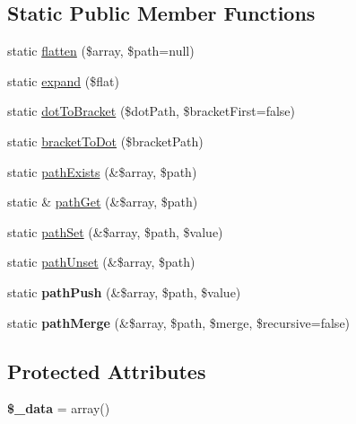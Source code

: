 \subsection*{Static Public Member Functions}
\begin{DoxyCompactItemize}
\item 
static \hyperlink{classMatrix_adcb5796c89a9d7eefa4acddcf83d9f20}{flatten} (\$array, \$path=null)
\item 
static \hyperlink{classMatrix_a9c51d19338f9d1e97ace7ae995292535}{expand} (\$flat)
\item 
static \hyperlink{classMatrix_ad7595b6aea73dc25a90dd72b03b99e2f}{dotToBracket} (\$dotPath, \$bracketFirst=false)
\item 
static \hyperlink{classMatrix_abf6a9524c9bb05d70b1fa94616f1fc7d}{bracketToDot} (\$bracketPath)
\item 
static \hyperlink{classMatrix_aa305f72d6665a0d17b77dafede90f208}{pathExists} (\&\$array, \$path)
\item 
static \& \hyperlink{classMatrix_aefa3e899317cb70f2ce981476c50b7ab}{pathGet} (\&\$array, \$path)
\item 
static \hyperlink{classMatrix_ad35901e861ff1f6af31d1d8745b1fc06}{pathSet} (\&\$array, \$path, \$value)
\item 
static \hyperlink{classMatrix_a7896e5ce4f773288a183e6cfe80fab56}{pathUnset} (\&\$array, \$path)
\item 
\hypertarget{classMatrix_a64b21313015529a5e9b7b6bfc0ae2283}{
static {\bfseries pathPush} (\&\$array, \$path, \$value)}
\label{classMatrix_a64b21313015529a5e9b7b6bfc0ae2283}

\item 
\hypertarget{classMatrix_a16344696c4a96a1a77f1aebb46bdecf6}{
static {\bfseries pathMerge} (\&\$array, \$path, \$merge, \$recursive=false)}
\label{classMatrix_a16344696c4a96a1a77f1aebb46bdecf6}

\end{DoxyCompactItemize}
\subsection*{Protected Attributes}
\begin{DoxyCompactItemize}
\item 
\hypertarget{classMatrix_afe54914d1576a306f59167b42c78c48c}{
{\bfseries \$\_\-data} = array()}
\label{classMatrix_afe54914d1576a306f59167b42c78c48c}

\end{DoxyCompactItemize}


